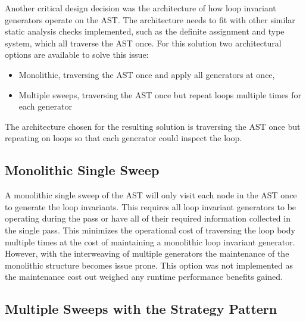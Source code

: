 Another critical design decision was the architecture of how loop invariant
generators operate on the AST.
The architecture needs to fit with other similar static analysis checks
implemented, such as the definite assignment and type system, which all
traverse the AST once.
For this solution two architectural options are available to solve this issue:

\begin{itemize}
    \item{Monolithic, traversing the AST once and apply all generators at once,}
    \item{Multiple sweeps, traversing the AST once but repeat loops multiple times for each generator}
\end{itemize}

The architecture chosen for the resulting solution is  traversing the AST once
but repeating on loops so that each generator could inspect the loop.

\subsection{Monolithic Single Sweep}

A monolithic single sweep of the AST will only visit each
node in the AST once to generate the loop invariants.
This requires all loop invariant generators to be operating
during the pass or have all of their required information collected
in the single pass.
This minimizes the operational cost of traversing the loop body
multiple times at the cost of maintaining a monolithic loop invariant generator.
However, with the interweaving of multiple generators the maintenance of the
monolithic structure becomes issue prone.
This option was not implemented as the maintenance cost out weighed any
runtime performance benefits gained.



\subsection{Multiple Sweeps with the Strategy Pattern}

